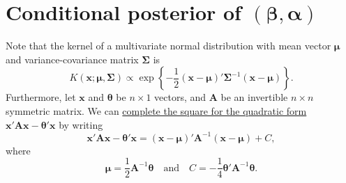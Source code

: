 \documentclass[cmfont,usenames,dvipsnames,leqno]{afit-etd}\usepackage[]{graphicx}\usepackage[]{color}
\begin{document}
\section{Conditional posterior of \texorpdfstring{$\left(\boldsymbol{\beta}, \boldsymbol{\alpha}\right)$}{polynomial and spline coefficients}}
\label{sec:conditional-theta}
Note that the kernel of a multivariate normal distribution with mean vector $\boldsymbol{\mu}$ and variance-covariance matrix $\boldsymbol{\Sigma}$ is 
\begin{equation*}
  K\left(\boldsymbol{x}; \boldsymbol{\mu}, \boldsymbol{\Sigma}\right) \propto \exp\left\{-\frac{1}{2}\left(\boldsymbol{x}-\boldsymbol{\mu}\right)'\boldsymbol{\Sigma}^{-1}\left(\boldsymbol{x}-\boldsymbol{\mu}\right)\right\}.
\end{equation*}
Furthermore, let $\boldsymbol{x}$ and $\boldsymbol{\theta}$ be $n \times 1$ vectors, and  $\boldsymbol{A}$ be an invertible $n \times n$ symmetric matrix. We can \href{http://en.wikipedia.org/wiki/Completing_the_square}{complete the square for the quadratic form} $\boldsymbol{x}'\boldsymbol{A}\boldsymbol{x} - \boldsymbol{\theta}'\boldsymbol{x}$ by writing
\begin{equation*}
  \boldsymbol{x}'\boldsymbol{A}\boldsymbol{x} - \boldsymbol{\theta}'\boldsymbol{x} = \left(\boldsymbol{x}-\boldsymbol{\mu}\right)'\boldsymbol{A}^{-1}\left(\boldsymbol{x}-\boldsymbol{\mu}\right) + C,
\end{equation*}
where 
\begin{equation*}
  \boldsymbol{\mu} = \frac{1}{2}\boldsymbol{A}^{-1}\boldsymbol{\theta} \quad \text{and} \quad C = -\frac{1}{4}\boldsymbol{\theta}'\boldsymbol{A}^{-1}\boldsymbol{\theta}.
\end{equation*}
\end{document}
